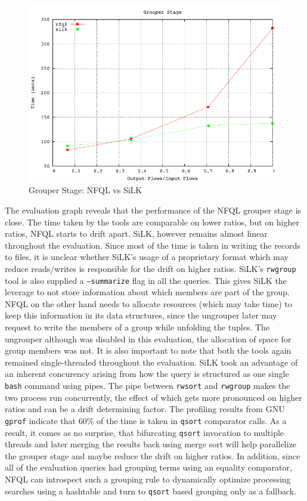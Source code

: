 \begin{figure}[h!]
  \begin{center}
    \includegraphics* [width=0.8\linewidth]{figures/benchmarks/grouper}
    \caption{Grouper Stage: NFQL vs SiLK}
    \label{fig:benchmarks-grouper}
  \end{center}
\end{figure}

The evaluation graph reveals that the performance of the \ac{NFQL} grouper
stage is close. The time taken by the tools are comparable on lower ratios,
but on higher ratios, \ac{NFQL} starts to drift apart. SiLK, however remains
almost linear throughout the evaluation. Since most of the time is taken in
writing the records to files, it is unclear whether SiLK's usage of a
proprietary format which may reduce reads/writes is responsible for the drift
on higher ratios. SiLK's \texttt{rwgroup} tool is also supplied a
\texttt{--summarize} flag in all the queries. This gives SiLK the leverage to
not store information about which members are part of the group.  \ac{NFQL} on
the other hand needs to allocate resources (which may take time) to keep this
information in its data structures, since  the ungrouper later may request to write the members of a group
while unfolding the tuples.  The ungrouper although was disabled in this
evaluation, the allocation of space for group members was not. It is also
important to note that both the tools again remained single-threaded
throughout the evaluation. SiLK took an advantage of an inherent concurency
arising from how the query is structured as one single \texttt{bash} command
using pipes. The pipe between \texttt{rwsort} and \texttt{rwgroup} makes the
two process run concurrently, the effect of which gets more pronounced on
higher ratios and can be a drift determining factor. The profiling results
from GNU \texttt{gprof} \cite{graham:1982} indicate that $60\%$ of the time is
taken in \texttt{qsort} comparator calls.  As a result, it comes as no
surprise, that bifurcating \texttt{qsort} invocation to multiple threads and
later merging the results back using merge sort will help parallelize the
grouper stage and maybe reduce the drift on higher ratios. In addition, since
all of the evaluation queries had grouping terms using an equality comparator,
\ac{NFQL} can introspect such a grouping rule to dynamically optimize
processing searches using a hashtable and turn to \texttt{qsort} based
grouping only as a fallback.


